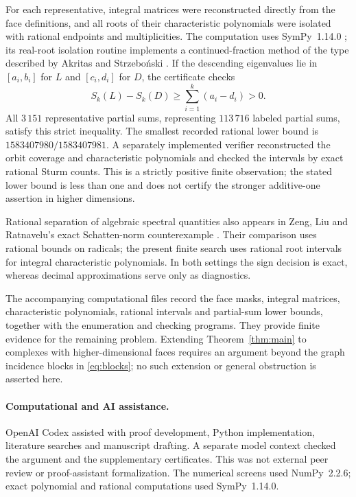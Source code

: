 \documentclass[11pt]{article}
\begin{document}
For each representative, integral matrices were reconstructed directly
from the face definitions, and all roots of their characteristic polynomials
were isolated with rational endpoints and multiplicities. The computation
uses SymPy~1.14.0 \cite{Meurer2017}; its real-root isolation routine implements
a continued-fraction method of the type described by Akritas and
Strzebo\'nski \cite{Akritas2005}. If the descending eigenvalues lie in
$[a_i,b_i]$ for $L$ and $[c_i,d_i]$ for $D$, the certificate checks
\[
 S_k(L)-S_k(D)\geq\sum_{i=1}^k(a_i-d_i)>0.
\]
All $3\,151$ representative partial sums, representing $113\,716$ labeled
partial sums, satisfy this strict inequality. The smallest recorded
rational lower bound is $1583407980/1583407981$. A separately implemented
verifier reconstructed the orbit coverage and characteristic polynomials
and checked the intervals by exact rational Sturm counts. This is a
strictly positive finite observation; the stated lower bound is less
than one and does not certify the stronger additive-one assertion in
higher dimensions.

Rational separation of algebraic spectral quantities also appears in
Zeng, Liu and Ratnavelu's exact Schatten-norm counterexample
\cite[Section 2, equations (8)--(18)]{Zeng2026}. Their comparison uses
rational bounds on radicals; the present finite search uses rational
root intervals for integral characteristic polynomials. In both settings
the sign decision is exact, whereas decimal approximations serve only
as diagnostics.

The accompanying computational files record the face masks, integral
matrices, characteristic polynomials, rational intervals and partial-sum
lower bounds, together with the enumeration and checking programs.
They provide finite evidence for the remaining problem. Extending
Theorem~\ref{thm:main} to complexes with higher-dimensional faces requires
an argument beyond the graph incidence blocks in \eqref{eq:blocks}; no
such extension or general obstruction is asserted here.

\paragraph{Computational and AI assistance.}
OpenAI Codex assisted with proof development, Python implementation,
literature searches and manuscript drafting. A separate model context
checked the argument and the supplementary certificates. This was not
external peer review or proof-assistant formalization. The numerical
screens used NumPy~2.2.6; exact polynomial and rational computations used
SymPy~1.14.0.


\raggedright


\end{document}
